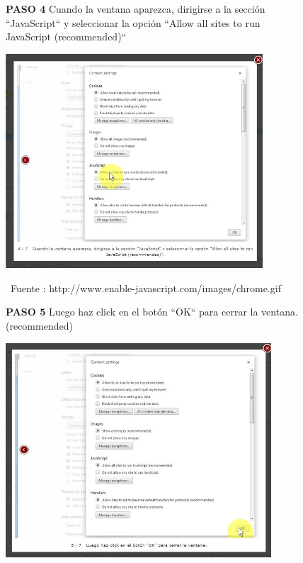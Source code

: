 \documentclass[11pt]{article} %
\begin{document}
\begin{figure}
\begin{center}
\begin{center}

\textbf{  PASO 4}
Cuando la ventana aparezca, dirigirse a la sección ``JavaScript``  y seleccionar la opción ``Allow all sites to run JavaScript (recommended)``
\newline
\end{center}

\includegraphics[height=8cm, width=8 cm] {imagenes/chrome 04.JPG}
\newline

\ Fuente :{ http://www.enable-javascript.com/images/chrome.gif }

\begin{center}
\textbf{ PASO 5}
Luego haz click en el botón ``OK`` para cerrar la ventana. (recommended)
\newline
\end{center}

\includegraphics[height=8cm, width=8 cm] {imagenes/chrome 05.JPG}
\newline
\newline
\newline
\end{center}
\end{figure}
\end{document}
